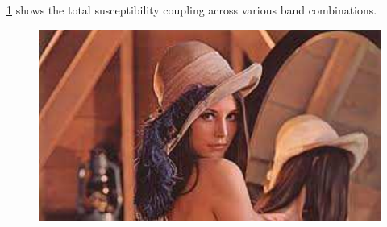 \Fig\ref{Fig:ResD:FullSusceptibility} shows the total susceptibility coupling across various band combinations.

\begin{figure}[htbp]
    \begin{center}
        \includegraphics[scale=0.7]{Misc/TODO}
        \caption{}
        \label{Fig:ResD:FullSusceptibility}
    \end{center}
\end{figure}

